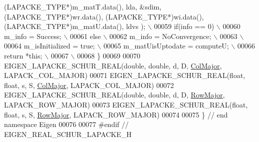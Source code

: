 \begin{DoxyCode}
{       (LAPACKE\_TYPE*)m\_matT.data(), lda, &sdim, (LAPACKE\_TYPE*)wr.data(), (LAPACKE\_TYPE*)wi.data(), (LAPACKE\_TYPE*)m\_matU.data(), ldvs ); \(\backslash\)}
00059 \textcolor{preprocessor}{  if(info == 0) \(\backslash\)}
00060 \textcolor{preprocessor}{    m\_info = Success; \(\backslash\)}
00061 \textcolor{preprocessor}{  else \(\backslash\)}
00062 \textcolor{preprocessor}{    m\_info = NoConvergence; \(\backslash\)}
00063 \textcolor{preprocessor}{\(\backslash\)}
00064 \textcolor{preprocessor}{  m\_isInitialized = true; \(\backslash\)}
00065 \textcolor{preprocessor}{  m\_matUisUptodate = computeU; \(\backslash\)}
00066 \textcolor{preprocessor}{  return *this; \(\backslash\)}
00067 \textcolor{preprocessor}{\(\backslash\)}
00068 \textcolor{preprocessor}{\}}
00069 
00070 EIGEN\_LAPACKE\_SCHUR\_REAL(\textcolor{keywordtype}{double},   \textcolor{keywordtype}{double}, d, D, \hyperlink{group__enums_ggaacded1a18ae58b0f554751f6cdf9eb13a0cbd4bdd0abcfc0224c5fcb5e4f6669a}{ColMajor}, LAPACK\_COL\_MAJOR)
00071 EIGEN\_LAPACKE\_SCHUR\_REAL(\textcolor{keywordtype}{float},    \textcolor{keywordtype}{float},  s, S, \hyperlink{group__enums_ggaacded1a18ae58b0f554751f6cdf9eb13a0cbd4bdd0abcfc0224c5fcb5e4f6669a}{ColMajor}, LAPACK\_COL\_MAJOR)
00072 EIGEN\_LAPACKE\_SCHUR\_REAL(\textcolor{keywordtype}{double},   \textcolor{keywordtype}{double}, d, D, \hyperlink{group__enums_ggaacded1a18ae58b0f554751f6cdf9eb13acfcde9cd8677c5f7caf6bd603666aae3}{RowMajor}, LAPACK\_ROW\_MAJOR)
00073 EIGEN\_LAPACKE\_SCHUR\_REAL(\textcolor{keywordtype}{float},    \textcolor{keywordtype}{float},  s, S, \hyperlink{group__enums_ggaacded1a18ae58b0f554751f6cdf9eb13acfcde9cd8677c5f7caf6bd603666aae3}{RowMajor}, LAPACK\_ROW\_MAJOR)
00074 
00075 \} \textcolor{comment}{// end namespace Eigen}
00076 
00077 \textcolor{preprocessor}{#endif // EIGEN\_REAL\_SCHUR\_LAPACKE\_H}
\end{DoxyCode}
